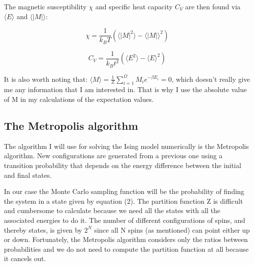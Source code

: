 \documentclass[twocolumn]{article}
\begin{document}
The magnetic susceptibility $\chi$ and specific heat capacity $C_V$ are then found via $\langle E \rangle$ and $\langle |M| \rangle$:

\begin{equation}
    \chi = \frac{1}{k_B T}( \langle |M|^2 \rangle - {\langle |M| \rangle}^2 )
\end{equation}

\begin{equation}
    C_V = \frac{1}{k_B t^2}( \langle E^2 \rangle - {\langle E \rangle}^2 )
\end{equation}

It is also worth noting that:\newline
$\langle M \rangle = \frac{1}{Z}\sum_{i=1}^{\Omega}M_i e^{-\beta E_i} = 0$,
which doesn't really give me any information that I am interested in. That is why I use the absolute value of M in my calculations of the expectation values.

\subsection{The Metropolis algorithm}
The algorithm I will use for solving the Ising model numerically is the Metropolis algorithm. New configurations are generated from a previous one using a transition probability that depends on the energy difference between the initial and final states.\newline

In our case the Monte Carlo sampling function will be the probability of finding the system in a state given by equation (2). The partition function Z is difficult and cumbersome to calculate because we need all the states with all the associated energies to do it. The number of different configurations of spins, and thereby states, is given by $2^N$ since all N spins (as mentioned) can point either up or down. Fortunately, the Metropolis algorithm considers only the ratios between probabilities and we do not need to compute the partition function at all because it cancels out.\newline
\end{document}
